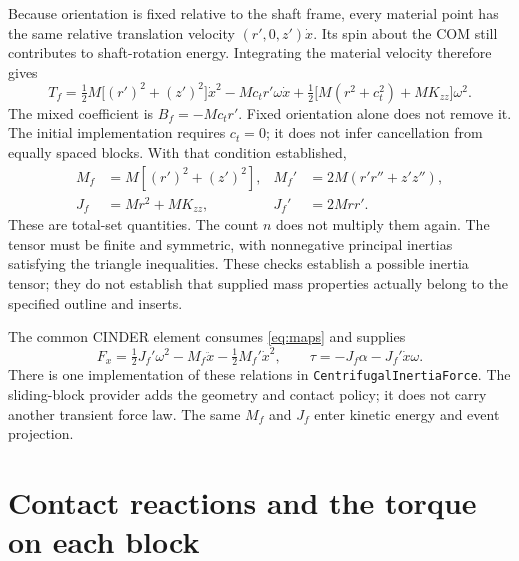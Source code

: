 \documentclass[11pt,letterpaper]{article}
\numberwithin{equation}{section}
\newcommand{\half}{\tfrac12}
\begin{document}
Because orientation is fixed relative to the shaft frame, every material point
has the same relative translation velocity $(r',0,z')\dot x$. Its spin about
the COM still contributes to shaft-rotation energy. Integrating the material
velocity therefore gives
\begin{equation}
 T_f=\half M\bigl[(r')^2+(z')^2\bigr]\dot x^2
       -M c_t r'\omega\dot x
       +\half\bigl[M(r^2+c_t^2)+M K_{zz}\bigr]\omega^2.
\end{equation}
The mixed coefficient is $B_f=-M c_t r'$. Fixed orientation alone does not
remove it. The initial implementation requires $c_t=0$; it does not infer
cancellation from equally spaced blocks. With that condition established,
\begin{equation}
\boxed{\begin{aligned}
 M_f&=M[(r')^2+(z')^2],&
 M_f'&=2M(r'r''+z'z''),\\
 J_f&=Mr^2+M K_{zz},& J_f'&=2Mrr'.
\end{aligned}}
\label{eq:maps}
\end{equation}
These are total-set quantities. The count $n$ does not multiply them again.
The tensor must be finite and symmetric, with nonnegative principal inertias
satisfying the triangle inequalities. These checks establish a possible
inertia tensor; they do not establish that supplied mass properties actually
belong to the specified outline and inserts.

The common CINDER element \cite{common} consumes \cref{eq:maps} and supplies
\begin{equation}
 F_x=\half J_f'\omega^2-M_f\ddot x-\half M_f'\dot x^2,
 \qquad \tau=-J_f\alpha-J_f'\dot x\omega.
 \label{eq:loads}
\end{equation}
There is one implementation of these relations in
\texttt{CentrifugalInertiaForce}. The sliding-block provider adds the geometry
and contact policy; it does not carry another transient force law. The same
$M_f$ and $J_f$ enter kinetic energy and event projection.

\section{Contact reactions and the torque on each block}
\label{sec:wrench}
\end{document}
